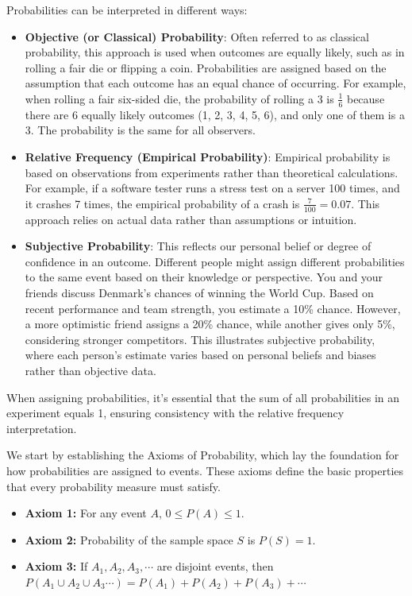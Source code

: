Probabilities can be interpreted in different ways:

\begin{itemize}
    \item \textbf{Objective (or Classical) Probability}: Often referred to as classical probability, this approach is used when outcomes are equally likely, such as in rolling a fair die or flipping a coin. Probabilities are assigned based on the assumption that each outcome has an equal chance of occurring. For example, when rolling a fair six-sided die, the probability of rolling a 3 is \( \frac{1}{6} \) because there are 6 equally likely outcomes (1, 2, 3, 4, 5, 6), and only one of them is a 3. The probability is the same for all observers.

    \item \textbf{Relative Frequency (Empirical Probability)}: Empirical probability is based on observations from experiments rather than theoretical calculations. For example, if a software tester runs a stress test on a server 100 times, and it crashes 7 times, the empirical probability of a crash is \( \frac{7}{100} = 0.07 \). This approach relies on actual data rather than assumptions or intuition.

    \item \textbf{Subjective Probability}: This reflects our personal belief or degree of confidence in an outcome. Different people might assign different probabilities to the same event based on their knowledge or perspective. You and your friends discuss Denmark’s chances of winning the World Cup. Based on recent performance and team strength, you estimate a 10\% chance. However, a more optimistic friend assigns a 20\% chance, while another gives only 5\%, considering stronger competitors. This illustrates subjective probability, where each person's estimate varies based on personal beliefs and biases rather than objective data.


\end{itemize}

When assigning probabilities, it’s essential that the sum of all probabilities in an experiment equals 1, ensuring consistency with the relative frequency interpretation.

We start by establishing the Axioms of Probability, which lay the foundation for how probabilities are assigned to events. These axioms define the basic properties that every probability measure must satisfy.

\begin{axiom}
    \begin{itemize}
        \item \textbf{Axiom 1:} For any event \(A\), \( 0 \leq P(A) \leq 1 \).
        \item \textbf{Axiom 2:} Probability of the sample space \(S\) is \(P(S) = 1\).
        \item \textbf{Axiom 3:} If \(A_1, A_2, A_3, \cdots\) are disjoint events, then \(P\left(A_1 \cup A_2 \cup A_3 \cdots\right) = P\left(A_1\right) + P\left(A_2\right) + P\left(A_3\right) + \cdots\)
    \end{itemize}
\end{axiom}

